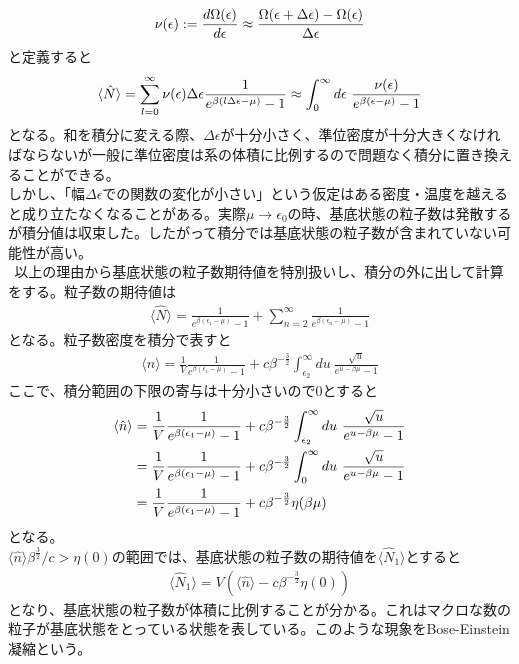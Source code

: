 \documentclass[dvipdfmx, 11pt, a4paper]{jsarticle}
\theoremstyle{definition}
\begin{document}
    \begin{align}
        \nu (\epsilon) := \frac{d\Omega(\epsilon) }{d \epsilon} \approx \frac {\Omega (\epsilon + \Delta \epsilon) - \Omega (\epsilon) }{\Delta \epsilon} \notag 
    \end{align}
    と定義すると
    \begin{align}
        \langle \hat{N} \rangle = \sum_{l=0}^{\infty} \nu (\epsilon) \Delta \epsilon   \frac{1}{e^{\beta (l\Delta \epsilon - \mu)} - 1} \approx \int_0^{\infty} d\epsilon\ \frac{\nu (\epsilon)}{e^{\beta (\epsilon - \mu)} - 1} \notag 
    \end{align}
    となる。和を積分に変える際、$\Delta \epsilon$が十分小さく、準位密度が十分大きくなければならないが一般に準位密度は系の体積に比例するので問題なく積分に置き換えることができる。\\
    しかし、「幅$\Delta \epsilon$での関数の変化が小さい」という仮定はある密度・温度を越えると成り立たなくなることがある。実際$\mu \rightarrow \epsilon_0$の時、基底状態の粒子数は発散するが積分値は収束した。したがって積分では基底状態の粒子数が含まれていない可能性が高い。\\
    $\ \ $以上の理由から基底状態の粒子数期待値を特別扱いし、積分の外に出して計算をする。粒子数の期待値は
    \begin{align}
        \langle \hat{N} \rangle = \frac{1}{e^{\beta (\epsilon_1 - \mu)} - 1} + \sum_{n=2}^{\infty} \frac{1}{e^{\beta (\epsilon_n - \mu)} - 1}
    \end{align}
    となる。粒子数密度を積分で表すと
    \begin{align}
        \langle \hat{n} \rangle = \frac{1}{V} \frac{1}{e^{\beta (\epsilon_1 - \mu)} - 1} + c \beta^{-\frac{3}{2}}\int_{\epsilon_2}^{\infty} du\ \frac{\sqrt{u}}{e^{u - \beta \mu} - 1}
    \end{align}
    ここで、積分範囲の下限の寄与は十分小さいので$0$とすると
    \begin{align}
        \langle \hat{n} \rangle &= \frac{1}{V} \frac{1}{e^{\beta (\epsilon_1 - \mu)} - 1} + c \beta^{-\frac{3}{2}}\int_{\epsilon_2}^{\infty} du\ \frac{\sqrt{u}}{e^{u - \beta \mu} - 1} \notag \\
        &= \frac{1}{V} \frac{1}{e^{\beta (\epsilon_1 - \mu)} - 1} + c \beta^{-\frac{3}{2}}\int_{0}^{\infty} du\ \frac{\sqrt{u}}{e^{u - \beta \mu} - 1} \notag \\
        &= \frac{1}{V} \frac{1}{e^{\beta (\epsilon_1 - \mu)} - 1} + c \beta^{-\frac{3}{2}} \eta (\beta \mu)
    \end{align}
    となる。\\
    $\langle \hat{n} \rangle \beta^{\frac{3}{2}} / c> \eta (0)$の範囲では、基底状態の粒子数の期待値を$\langle \hat{N}_1 \rangle$とすると
    \begin{align}
        \langle \hat{N}_1 \rangle = V \left( \langle \hat{n} \rangle - c \beta^{-\frac{3}{2}} \eta (0) \right)
    \end{align}
    となり、基底状態の粒子数が体積に比例することが分かる。これはマクロな数の粒子が基底状態をとっている状態を表している。このような現象をBose-Einstein凝縮という。
\end{document}

